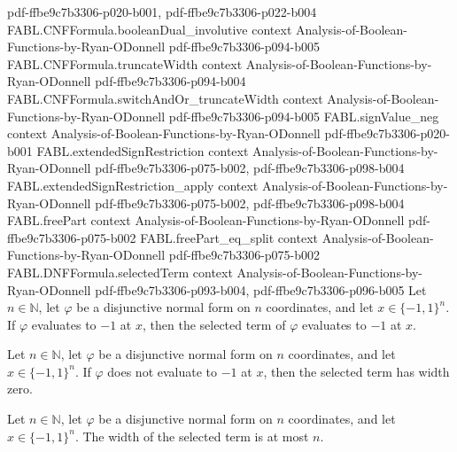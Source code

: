 \begin{theorem}
  {pdf-ffbe9c7b3306-p020-b001,
    pdf-ffbe9c7b3306-p022-b004}
\proofstep
  {FABL.CNFFormula.booleanDual_involutive}
  {context}
  {Analysis-of-Boolean-Functions-by-Ryan-ODonnell}
  {pdf-ffbe9c7b3306-p094-b005}
\proofstep
  {FABL.CNFFormula.truncateWidth}
  {context}
  {Analysis-of-Boolean-Functions-by-Ryan-ODonnell}
  {pdf-ffbe9c7b3306-p094-b004}
\proofstep
  {FABL.CNFFormula.switchAndOr_truncateWidth}
  {context}
  {Analysis-of-Boolean-Functions-by-Ryan-ODonnell}
  {pdf-ffbe9c7b3306-p094-b005}
\proofstep
  {FABL.signValue_neg}
  {context}
  {Analysis-of-Boolean-Functions-by-Ryan-ODonnell}
  {pdf-ffbe9c7b3306-p020-b001}
\proofstep
  {FABL.extendedSignRestriction}
  {context}
  {Analysis-of-Boolean-Functions-by-Ryan-ODonnell}
  {pdf-ffbe9c7b3306-p075-b002,
    pdf-ffbe9c7b3306-p098-b004}
\proofstep
  {FABL.extendedSignRestriction_apply}
  {context}
  {Analysis-of-Boolean-Functions-by-Ryan-ODonnell}
  {pdf-ffbe9c7b3306-p075-b002,
    pdf-ffbe9c7b3306-p098-b004}
\proofstep
  {FABL.freePart}
  {context}
  {Analysis-of-Boolean-Functions-by-Ryan-ODonnell}
  {pdf-ffbe9c7b3306-p075-b002}
\proofstep
  {FABL.freePart_eq_split}
  {context}
  {Analysis-of-Boolean-Functions-by-Ryan-ODonnell}
  {pdf-ffbe9c7b3306-p075-b002}
\proofstep
  {FABL.DNFFormula.selectedTerm}
  {context}
  {Analysis-of-Boolean-Functions-by-Ryan-ODonnell}
  {pdf-ffbe9c7b3306-p093-b004,
    pdf-ffbe9c7b3306-p096-b005}
Let $n\in\mathbb N$, let $\varphi$ be a disjunctive normal form on $n$ coordinates, and
let $x\in\{-1,1\}^n$. If $\varphi$ evaluates to $-1$ at $x$, then the selected term of
$\varphi$ evaluates to $-1$ at $x$.
\end{theorem}

\begin{theorem}
\label{FABL.DNFFormula.selectedWidth_eq_zero_of_eval_ne}
\leanok
{}
Let $n\in\mathbb N$, let $\varphi$ be a disjunctive normal form on $n$ coordinates, and
let $x\in\{-1,1\}^n$. If $\varphi$ does not evaluate to $-1$ at $x$, then the selected
term has width zero.
\end{theorem}

\begin{theorem}
\label{FABL.DNFFormula.selectedWidth_le_dimension}
\leanok
{}
Let $n\in\mathbb N$, let $\varphi$ be a disjunctive normal form on $n$ coordinates, and
let $x\in\{-1,1\}^n$. The width of the selected term is at most $n$.
\end{theorem}

